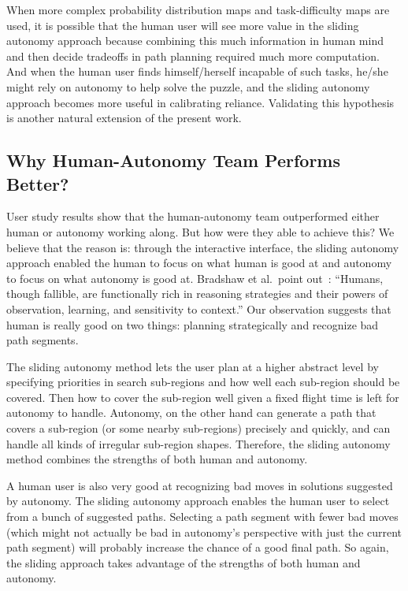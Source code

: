 When more complex probability distribution maps and task-difficulty maps are used, it is possible that the human user will see more value in the sliding autonomy approach because combining this much information in human mind and then decide tradeoffs in path planning required much more computation. And when the human user finds himself/herself incapable of such tasks, he/she might rely on autonomy to help solve the puzzle, and the sliding autonomy approach becomes more useful in calibrating reliance. Validating this hypothesis is another natural extension of the present work.

\subsection{Why Human-Autonomy Team Performs Better?}

User study results show that the human-autonomy team outperformed either human or autonomy working along. But how were they able to achieve this? We believe that the reason is: through the interactive interface, the sliding autonomy approach enabled the human to focus on what human is good at and autonomy to focus on what autonomy is good at. Bradshaw et al.\ point out~\cite{Bradshaw2013Seven}: ``Humans, though fallible, are functionally rich in reasoning strategies and their powers of observation, learning, and sensitivity to context.'' Our observation suggests that human is really good on two things: planning strategically and recognize bad path segments.

The sliding autonomy method lets the user plan at a higher abstract level by specifying priorities in search sub-regions and how well each sub-region should be covered. Then how to cover the sub-region well given a fixed flight time is left for autonomy to handle. Autonomy, on the other hand can generate a path that covers a sub-region (or some nearby sub-regions) precisely and quickly, and can handle all kinds of irregular sub-region shapes. Therefore, the sliding autonomy method combines the strengths of both human and autonomy.

A human user is also very good at recognizing bad moves in solutions suggested by autonomy. The sliding autonomy approach enables the human user to select from a bunch of suggested paths. Selecting a path segment with fewer bad moves (which might not actually be bad in autonomy's perspective with just the current path segment) will probably increase the chance of a good final path. So again, the sliding approach takes advantage of the strengths of both human and autonomy.

